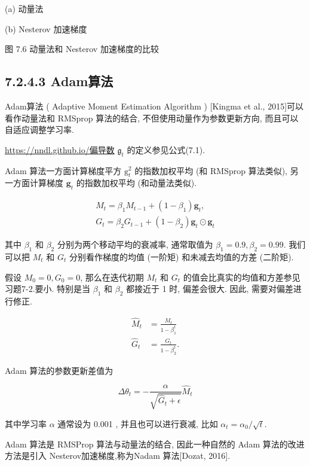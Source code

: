 \documentclass[10pt]{article}
\begin{document}
(a) 动量法



(b) Nesterov 加速梯度

图 7.6 动量法和 Nesterov 加速梯度的比较

\subsection*{7.2.4.3 Adam算法}
Adam算法 ( Adaptive Moment Estimation Algorithm ) [Kingma et al., 2015]可以看作动量法和 RMSprop 算法的结合, 不但使用动量作为参数更新方向, 而且可以自适应调整学习率.

\href{https://nndl.github.io/%E5%81%8F%E5%AF%BC%E6%95%B0}{https://nndl.github.io/偏导数} $\mathfrak{g}_{t}$ 的定义参见公式(7.1).

Adam 算法一方面计算梯度平方 $\mathrm{g}_{t}^{2}$ 的指数加权平均 (和 RMSprop 算法类似), 另一方面计算梯度 $\mathbf{g}_{t}$ 的指数加权平均 (和动量法类似).

\[
\begin{array}{r}
M_{t}=\beta_{1} M_{t-1}+\left(1-\beta_{1}\right) \boldsymbol{g}_{t}, \\
G_{t}=\beta_{2} G_{t-1}+\left(1-\beta_{2}\right) \boldsymbol{g}_{t} \odot \boldsymbol{g}_{t} \tag{7.26}
\end{array}
\]

其中 $\beta_{1}$ 和 $\beta_{2}$ 分别为两个移动平均的衰减率, 通常取值为 $\beta_{1}=0.9, \beta_{2}=0.99$. 我们可以把 $M_{t}$ 和 $G_{t}$ 分别看作梯度的均值 (一阶矩) 和未减去均值的方差 (二阶矩).

假设 $M_{0}=0, G_{0}=0$, 那么在迭代初期 $M_{t}$ 和 $G_{t}$ 的值会比真实的均值和方差参见习题7-2.要小. 特别是当 $\beta_{1}$ 和 $\beta_{2}$ 都接近于 1 时, 偏差会很大. 因此, 需要对偏差进行修正.


\begin{align*}
\hat{M}_{t} & =\frac{M_{t}}{1-\beta_{1}^{t}}  \tag{7.27}\\
\hat{G}_{t} & =\frac{G_{t}}{1-\beta_{2}^{t}} . \tag{7.28}
\end{align*}


Adam 算法的参数更新差值为


\begin{equation*}
\Delta \theta_{t}=-\frac{\alpha}{\sqrt{\hat{G}_{t}+\epsilon}} \hat{M}_{t} \tag{7.29}
\end{equation*}


其中学习率 $\alpha$ 通常设为 0.001 , 并且也可以进行衰减, 比如 $\alpha_{t}=\alpha_{0} / \sqrt{t}$.

Adam 算法是 RMSProp 算法与动量法的结合, 因此一种自然的 Adam 算法的改进方法是引入 Nesterov加速梯度,称为Nadam 算法[Dozat, 2016].
\end{document}

